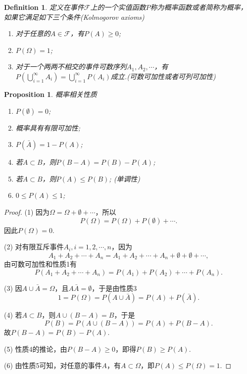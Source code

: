 \documentclass{article}
\newtheorem{proposition}[theorem]{Proposition}
\newtheorem{definition}[theorem]{Definition}
\begin{document}
\begin{definition}
\rm 定义在事件$\mathscr{F}$上的一个实值函数$P$称为{\color{red}概率函数}或者简称为概率，如果它满足如下三个条件(Kolmogorov axioms)
\begin{enumerate}
	\item 对于任意的$A \in \mathscr{F}$，有$P(A) \geq 0$;
	\item $P(\Omega) = 1$;
	\item 对于一个两两不相交的事件可数序列$A_1,A_2,\cdots$，有$P(\bigcup\limits_{i=1}^{\infty} A_i) = \bigcup\limits_{i=1}^{\infty}P(A_i)$成立.({\color{red}可数可加性或者可列可加性})
\end{enumerate}
\end{definition}


\begin{proposition}
\rm {\color{red}概率相关性质}
\begin{enumerate}
	\item $P(\emptyset) = 0$;
	\item 概率具有有限可加性;
	\item $P(\bar{A}) = 1 - P(A)$;
	\item 若$A \subset B$，则$P(B-A) = P(B) - P(A)$;
	\item 若$A\subset B$，则$P(A) \leq P(B)$; (单调性)
	\item $0 \leq P(A) \leq 1$;
\end{enumerate}
\end{proposition}

\begin{proof}
(1) 因为$\Omega = \Omega + \emptyset + \cdots$，所以
$$
P(\Omega) = P(\Omega) + P(\emptyset) + \cdots.
$$
因此$P(\Omega) = 0$.

(2) 对有限互斥事件$A_i,i=1,2,\cdots,n$，因为
$$
A_1 + A_2 + \cdots + A_n = A_1 + A_2 + \cdots + A_n + \emptyset +\emptyset + \cdots,
$$
由可数可加性和性质1有
$$
P(A_1 + A_2 + \cdots + A_n) = P(A_1) + P(A_2) + \cdots + P(A_n). 
$$

(3)
因$A \cup \bar{A} = \Omega$，且$A\bar{A} = \emptyset$，于是由性质3
$$
1 = P(\Omega) = P(A \cup \bar{A}) = P(A) + P(\bar{A}).
$$

(4) 若$A \subset B$，则$A \cup (B-A) = B$，于是
$$
P(B) = P(A \cup (B-A)) = P(A) + P(B-A).
$$
故$P(B-A) = P(B) - P(A)$. 

(5) 性质4的推论，由$P(B-A) \geq 0$，即得$P(B) \geq P(A)$. 

(6) 由性质5可知，对任意的事件$A$，有$A \subset \Omega$，即$P(A) \leq P(\Omega) = 1$. 
\end{proof}
\end{document}
